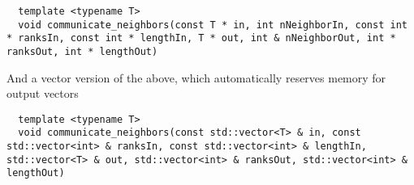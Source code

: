 \begin{mybox}
\begin{lstlisting}
  template <typename T>
  void communicate_neighbors(const T * in, int nNeighborIn, const int * ranksIn, const int * lengthIn, T * out, int & nNeighborOut, int * ranksOut, int * lengthOut)
\end{lstlisting}
\end{mybox}

And a vector version of the above, which automatically reserves memory for output vectors \\

\begin{mybox}
\begin{lstlisting}
  template <typename T>
  void communicate_neighbors(const std::vector<T> & in, const std::vector<int> & ranksIn, const std::vector<int> & lengthIn, std::vector<T> & out, std::vector<int> & ranksOut, std::vector<int> & lengthOut)
\end{lstlisting}
\end{mybox}



